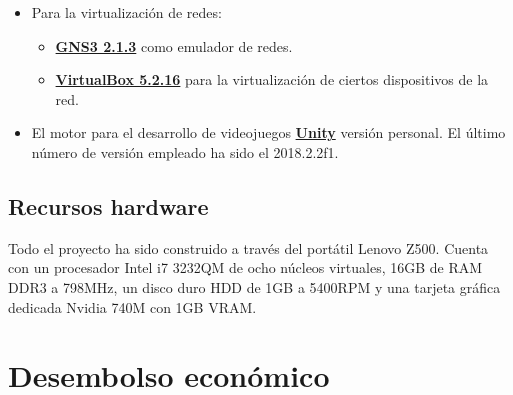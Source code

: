 \begin{itemize}
\begin{itemize}
\end{itemize}
\item Para la virtualización de redes:
\begin{itemize}
\item \href{https://www.gns3.com/}{\textbf{GNS3 2.1.3}} como emulador de redes.
\item \href{https://www.virtualbox.org/}{\textbf{VirtualBox 5.2.16}} para la virtualización de ciertos dispositivos de la red.
\end{itemize}
\item El motor para el desarrollo de videojuegos \href{https://unity3d.com/es}{\textbf{Unity}} versión personal. El último número de versión empleado ha sido el 2018.2.2f1.
\end{itemize}

\subsection{Recursos hardware}
Todo el proyecto ha sido construido a través del portátil Lenovo Z500. Cuenta con un procesador Intel i7 3232QM de ocho núcleos virtuales, 16GB de RAM DDR3 a 798MHz, un disco duro HDD de 1GB a 5400RPM y una tarjeta gráfica dedicada Nvidia 740M con 1GB VRAM.

\section{Desembolso económico}



